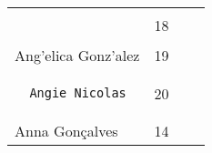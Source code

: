\documentclass[]{article}
\begin{document}
\begin{longtable}[c]{@{}llll@{}}
\begin{minipage}[t]{0.39\columnwidth}
\begin{verbatim}
\end{verbatim}
\end{minipage} & \begin{minipage}[t]{0.10\columnwidth}\raggedright
18
\end{minipage} & \begin{minipage}[t]{0.13\columnwidth}\raggedright
\end{minipage} & \begin{minipage}[t]{0.15\columnwidth}\raggedright
\end{minipage}
\\\noalign{\medskip}
\begin{minipage}[t]{0.39\columnwidth}\raggedright
Ang'elica Gonz'alez
\end{minipage} & \begin{minipage}[t]{0.10\columnwidth}\raggedright
19
\end{minipage} & \begin{minipage}[t]{0.13\columnwidth}\raggedright
\end{minipage} & \begin{minipage}[t]{0.15\columnwidth}\raggedright
\end{minipage}
\\\noalign{\medskip}
\begin{minipage}[t]{0.39\columnwidth}\raggedright
\begin{verbatim}
  Angie Nicolas
\end{verbatim}
\end{minipage} & \begin{minipage}[t]{0.10\columnwidth}\raggedright
20
\end{minipage} & \begin{minipage}[t]{0.13\columnwidth}\raggedright
\end{minipage} & \begin{minipage}[t]{0.15\columnwidth}\raggedright
\end{minipage}
\\\noalign{\medskip}
\begin{minipage}[t]{0.39\columnwidth}\raggedright
Anna Gon\c{c}alves
\end{minipage} & \begin{minipage}[t]{0.10\columnwidth}\raggedright
14
\end{minipage} & \begin{minipage}[t]{0.13\columnwidth}\raggedright
\end{minipage} & \begin{minipage}[t]{0.15\columnwidth}\raggedright

\end{minipage}
\end{longtable}
\end{document}
